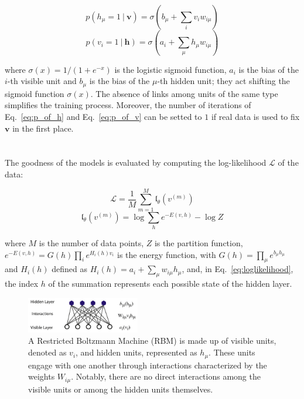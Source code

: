 \documentclass[prl,twocolumn]{revtex4-1}
\numberwithin{equation}{section}
\begin{document}
\begin{equation}
	p(h_\mu=1\ |\ \mathbf{v}) = \sigma(b_\mu + \sum_{i}v_iw_{i\mu})
	\label{eq:p_of_h}
\end{equation}
\begin{equation}
	p(v_i=1\ |\ \mathbf{h}) = \sigma(a_i + \sum_{\mu}h_{\mu}w_{i\mu})
	\label{eq:p_of_v}
\end{equation}

where $\sigma(x)=1/(1+e^{-x})$ is the logistic sigmoid function, $a_i$ is the bias of the $i$-th visible unit and $b_\mu$ is the bias of the $\mu$-th hidden unit; they act shifting the sigmoid function $\sigma(x)$. The absence of links among units of the same type simplifies the training process. Moreover, the number of iterations of Eq.~\ref{eq:p_of_h} and Eq.~\ref{eq:p_of_v} can be setted to $1$ if real data is used to fix $\mathbf{v}$ in the first place.
\\
\\
\\
The goodness of the models is evaluated by computing the log-likelihood $\mathcal{L}$ of the data:

\begin{equation}
	\mathcal{L}=\frac{1}{M}\sum_{m=1}^{M}{\mathfrak{l}_{\theta}(v^{(m)})}
	\label{eq:Loglikelihood}
\end{equation}
\begin{equation}
	\mathfrak{l}_{\theta}(v^{(m)})=\log\sum_{h}{e^{-E(v,h)}-\log{Z}}
	\label{eq:loglikelihood}
\end{equation}

where $M$ is the number of data points, $Z$ is the partition function, $e^{-E(v,h)}=G(h)\prod_{i}{e^{H_i(h)v_i}}$ is the energy function, with $G(h)=\prod_{\mu}{e^{b_{\mu}h_{\mu}}}$ and $H_i(h)$ defined as $H_i(h)=a_i+\sum_{\mu}w_{i\mu}h_\mu$, and, in Eq.~\ref{eq:loglikelihood}, the index $h$ of the summation represents each possible state of the hidden layer.

\begin{figure}[!tb]
	\includegraphics[width=0.44\textwidth]{RBM_structure.png}
	\caption{A Restricted Boltzmann Machine (RBM) is made up of visible units, denoted as $v_i$, and hidden units, represented as $h_\mu$. These units engage with one another through interactions characterized by the weights $W_{i\mu}$. Notably, there are no direct interactions among the visible units or among the hidden units themselves.}
	\label{fig:RBM_architecture}
\end{figure}
\end{document}

